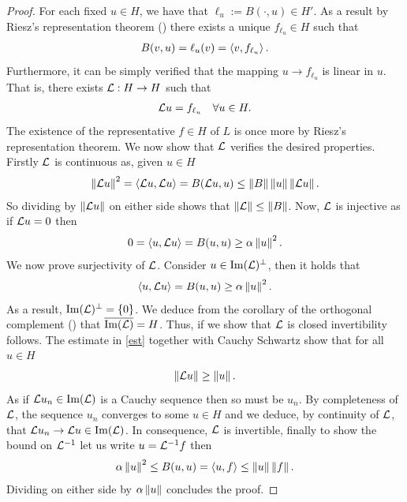 \documentclass[
    a4paper,
    DIV=14,
    abstract=true,
    numbers=noenddot
]{scrartcl}
\begin{document}
	\begin{proof}
		For each fixed $u \in H$, we have that $\ell_u :=B(\cdot ,u) \in  H'$. As a result by Riesz's representation theorem () there exists a unique $ f_{\ell _u} \in H$ such that
		\begin{align}\label{f}
			B(v,u)= \ell _u(v)= \left\langle v, f_{\ell _u}\right\rangle .
		\end{align}
		Furthermore, it can be simply verified that the mapping $u \to f_{\ell _u}$ is linear in $u$. That is, there exists $\mathcal{L}: H\to H$ such that
		\begin{align}\label{g}
			\mathcal{L} u =f_{\ell _u} \quad\forall  u \in H.
		\end{align}
		The existence of the representative  $f \in  H$ of $L$ is once more by Riesz's representation theorem. We now show that $\mathcal{L}$ verifies the desired properties. Firstly $\mathcal{L}$ is continuous as, given $u\in  H$ \begin{align*}
			\left\lVert \mathcal{L} u \right\rVert^2=\left\langle\mathcal{L} u,  \mathcal{L} u\right\rangle=B(\mathcal{L} u, u)\leq \left\lVert B \right\rVert \left\lVert u \right\rVert\left\lVert  \mathcal{L} u \right\rVert.
		\end{align*}
		So dividing by $\left\lVert \mathcal{L} u \right\rVert$ on either side shows that $\left\lVert \mathcal{L} \right\rVert \leq \left\lVert B \right\rVert$. Now, $\mathcal{L}$ is
		injective as if $ \mathcal{L} u=0$ then
		\begin{align*}
			0=\left\langle u, \mathcal{L} u\right\rangle= B(u,u) \geq \alpha \left\lVert u \right\rVert^2 .
		\end{align*}
		We now prove surjectivity of $\mathcal{L}$. Consider  $ u \in  \mathrm{Im}(\mathcal{L})^\perp$, then it holds that
		\begin{align}\label{est}
			\left\langle u, \mathcal{L} u\right\rangle= B(u,u)\geq \alpha \left\lVert u \right\rVert^2.
		\end{align}
		As a result, $\mathrm{Im}(\mathcal{L})^\perp = \{0\}$. We deduce from the corollary of the orthogonal complement () that $\overline{\mathrm{Im}(\mathcal{L})}=H$. Thus, if we show that $\mathcal{L}$ is closed invertibility follows. The estimate in \eqref{est} together with Cauchy Schwartz show that for all $u \in H$
		\begin{align*}
			\left\lVert  \mathcal{L} u \right\rVert\geq \left\lVert u \right\rVert.
		\end{align*}
		As if $ \mathcal{L} u_n \in  \mathrm{Im} (\mathcal{L})$ is a Cauchy sequence then so must be $u_n$. By completeness of  $\mathcal{L}$, the sequence  $u_n$ converges to some  $u \in  H$ and we deduce, by continuity of $\mathcal{L}$,
		that $ \mathcal{L} u_n \to \mathcal{L} u \in \mathrm{Im} (\mathcal{L})$. In consequence, $\mathcal{L}$ is invertible, finally to show the bound on $\mathcal{L}^{-1}$ let us write $u =\mathcal{L}^{-1} f$ then
		\begin{align*}
			\alpha \left\lVert u \right\rVert^2 \leq B(u,u) = \left\langle u,f\right\rangle\leq \left\lVert u \right\rVert\left\lVert f \right\rVert .
		\end{align*}
		Dividing on either side by $\alpha \left\lVert u \right\rVert$ concludes the proof.
	\end{proof}
\end{document}
